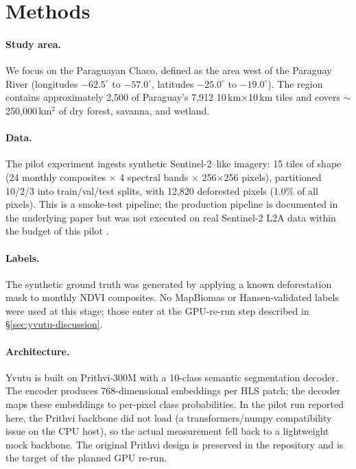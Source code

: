 \section{Methods}
\label{sec:yvutu-methods}

\paragraph{Study area.} We focus on the Paraguayan Chaco, defined as the
area west of the Paraguay River (longitudes $-62.5^\circ$ to
$-57.0^\circ$, latitudes $-25.0^\circ$ to $-19.0^\circ$). The region
contains approximately 2{,}500 of Paraguay's 7{,}912 10\,km$\times$10\,km
tiles and covers $\sim$250{,}000\,km$^2$ of dry forest, savanna, and
wetland.

\paragraph{Data.} The pilot experiment ingests synthetic
Sentinel-2--like imagery: 15 tiles of shape
(24 monthly composites $\times$ 4 spectral bands $\times$ 256$\times$256
pixels), partitioned 10/2/3 into train/val/test splits, with 12{,}820
deforested pixels (1.0\% of all pixels). This is a smoke-test pipeline;
the production pipeline is documented in the underlying paper but was
not executed on real Sentinel-2 L2A data within the budget of this
pilot \citep{esa2015}.

\paragraph{Labels.} The synthetic ground truth was generated by applying
a known deforestation mask to monthly NDVI composites. No MapBiomas or
Hansen-validated labels were used at this stage; those enter at the
GPU-re-run step described in \S\ref{sec:yvutu-discussion}.

\paragraph{Architecture.} Yvutu is built on Prithvi-300M \citep{jakubik2023}
with a 10-class semantic segmentation decoder. The encoder produces
768-dimensional embeddings per HLS patch; the decoder maps these
embeddings to per-pixel class probabilities. In the pilot run reported
here, the Prithvi backbone did not load (a transformers/numpy
compatibility issue on the CPU host), so the actual measurement
fell back to a lightweight mock backbone. The original Prithvi design is
preserved in the repository and is the target of the planned GPU
re-run.

